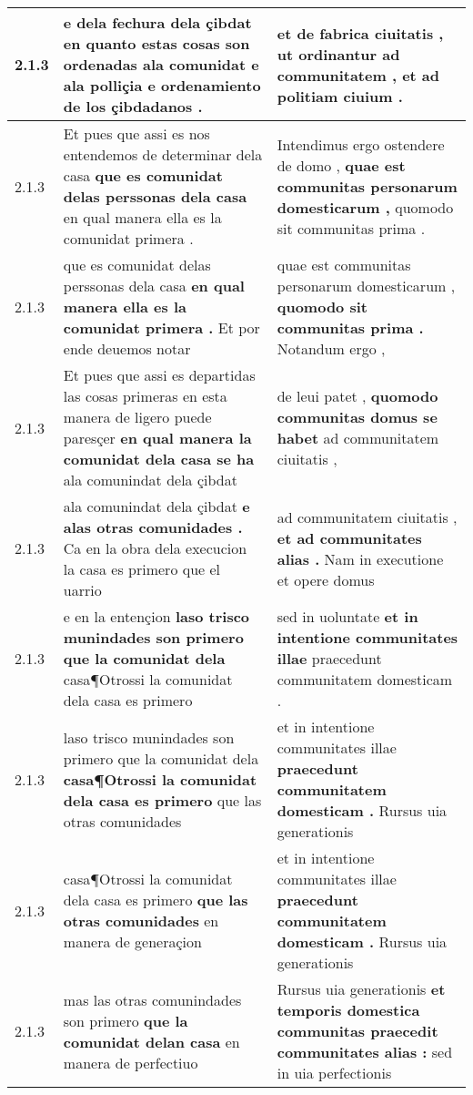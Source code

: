 \begin{tabular}{|p{1cm}|p{6.5cm}|p{6.5cm}|}
2.1.3 & e dela fechura dela çibdat \textbf{ en quanto estas cosas son ordenadas ala comunidat } e ala polliçia e ordenamiento de los çibdadanos . & et de fabrica ciuitatis , \textbf{ ut ordinantur ad communitatem , } et ad politiam ciuium . \\\hline
2.1.3 & Et pues que assi es nos entendemos de determinar dela casa \textbf{ que es comunidat delas perssonas dela casa } en qual manera ella es la comunidat primera . & Intendimus ergo ostendere de domo , \textbf{ quae est communitas personarum domesticarum , } quomodo sit communitas prima . \\\hline
2.1.3 & que es comunidat delas perssonas dela casa \textbf{ en qual manera ella es la comunidat primera . } Et por ende deuemos notar & quae est communitas personarum domesticarum , \textbf{ quomodo sit communitas prima . } Notandum ergo , \\\hline
2.1.3 & Et pues que assi es departidas las cosas primeras en esta manera de ligero puede paresçer \textbf{ en qual manera la comunidat dela casa se ha } ala comunindat dela çibdat & de leui patet , \textbf{ quomodo communitas domus se habet } ad communitatem ciuitatis , \\\hline
2.1.3 & ala comunindat dela çibdat \textbf{ e alas otras comunidades . } Ca en la obra dela execucion la casa es primero que el uarrio & ad communitatem ciuitatis , \textbf{ et ad communitates alias . } Nam in executione et opere domus \\\hline
2.1.3 & e en la entençion \textbf{ laso trisco munindades son primero que la comunidat dela } casa¶Otrossi la comunidat dela casa es primero & sed in uoluntate \textbf{ et in intentione communitates illae } praecedunt communitatem domesticam . \\\hline
2.1.3 & laso trisco munindades son primero que la comunidat dela \textbf{ casa¶Otrossi la comunidat dela casa es primero } que las otras comunidades & et in intentione communitates illae \textbf{ praecedunt communitatem domesticam . } Rursus uia generationis \\\hline
2.1.3 & casa¶Otrossi la comunidat dela casa es primero \textbf{ que las otras comunidades } en manera de generaçion & et in intentione communitates illae \textbf{ praecedunt communitatem domesticam . } Rursus uia generationis \\\hline
2.1.3 & mas las otras comunindades son primero \textbf{ que la comunidat delan casa } en manera de perfectiuo & Rursus uia generationis \textbf{ et temporis domestica communitas praecedit communitates alias : } sed in uia perfectionis \\\hline

\end{tabular}
